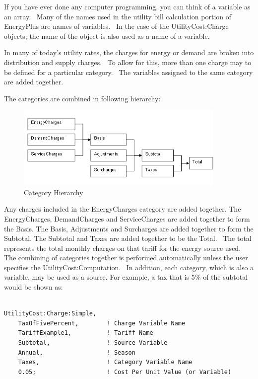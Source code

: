 If you have ever done any computer programming, you can think of a variable as an array.~ Many of the names used in the utility bill calculation portion of EnergyPlus are names of variables.~ In the case of the UtilityCost:Charge objects, the name of the object is also used as a name of a variable.

In many of today's utility rates, the charges for energy or demand are broken into distribution and supply charges.~ To allow for this, more than one charge may to be defined for a particular category.~ The variables assigned to the same category are added together.

The categories are combined in following hierarchy:


\begin{figure}[hbtp]
\centering
\includegraphics[width=0.9\textwidth, height=0.9\textheight, keepaspectratio=true]{media/image7909.png}
\caption{Category Hierarchy \label{fig:category-hierarchy}}
\end{figure}

Any charges included in the EnergyCharges category are added together. The EnergyCharges, DemandCharges and ServiceCharges are added together to form the Basis. The Basis, Adjustments and Surcharges are added together to form the Subtotal. The Subtotal and Taxes are added together to be the Total.~ The total represents the total monthly charges on that tariff for the energy source used.~ The combining of categories together is performed automatically unless the user specifies the UtilityCost:Computation.~ In addition, each category, which is also a variable, may be used as a source. For example, a tax that is 5\% of the subtotal would be shown as:

\begin{lstlisting}

UtilityCost:Charge:Simple,
    TaxOfFivePercent,        ! Charge Variable Name
    TariffExample1,          ! Tariff Name
    Subtotal,                ! Source Variable
    Annual,                  ! Season
    Taxes,                   ! Category Variable Name
    0.05;                    ! Cost Per Unit Value (or Variable)
\end{lstlisting}


